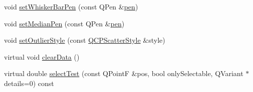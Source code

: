 \begin{DoxyCompactItemize}
\item 
void \hyperlink{class_q_c_p_statistical_box_aa8d3e503897788e1abf68dc74b5f147f}{set\+Whisker\+Bar\+Pen} (const Q\+Pen \&\hyperlink{class_q_c_p_abstract_plottable_a41d060007cc6b3037c9c04d22d0c0398}{pen})
\item 
void \hyperlink{class_q_c_p_statistical_box_a7260ac55b669f5d0a74f16d5ca84c52c}{set\+Median\+Pen} (const Q\+Pen \&\hyperlink{class_q_c_p_abstract_plottable_a41d060007cc6b3037c9c04d22d0c0398}{pen})
\item 
void \hyperlink{class_q_c_p_statistical_box_ad5241943422eb8e58360a97e99ad6aa7}{set\+Outlier\+Style} (const \hyperlink{class_q_c_p_scatter_style}{Q\+C\+P\+Scatter\+Style} \&style)
\item 
virtual void \hyperlink{class_q_c_p_statistical_box_a19112994449df0c20287858436cc68e3}{clear\+Data} ()
\item 
virtual double \hyperlink{class_q_c_p_statistical_box_a7d3ac843dc48a085740fdfc4319a89cc}{select\+Test} (const Q\+Point\+F \&pos, bool only\+Selectable, Q\+Variant $\ast$details=0) const 
\end{DoxyCompactItemize}
